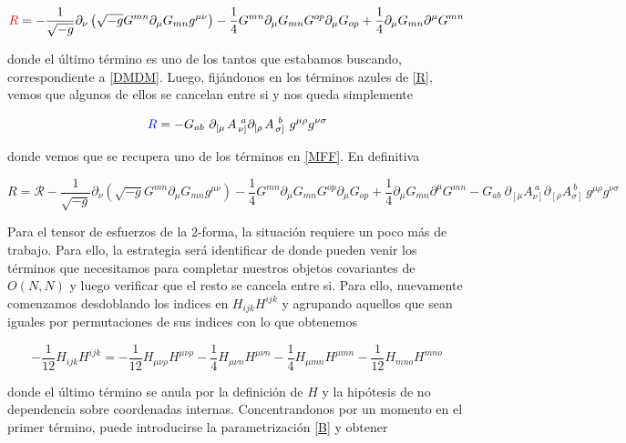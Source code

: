 \documentclass{article}
\numberwithin{equation}{section}
\begin{document}
\begin{equation}
\textcolor{red}{R} = - \frac{1}{\sqrt{-g}} \partial_{\nu} \left( \sqrt{-g} G^{m n} \partial_{\mu}{G_{m n}} g^{\mu \nu} \right) - \frac{1}{4} G^{m n} \partial_{\mu}{G_{m n}} G^{o p} \partial_{\mu}{G_{o p}} + \frac{1}{4} \partial_{\mu}{G_{m n}}\partial^{\mu} G^{m n}
\end{equation}

donde el último término es uno de los tantos que estabamos buscando, correspondiente a \ref{DMDM}.
Luego, fijándonos en los términos azules de \ref{R}, vemos que algunos de ellos se cancelan entre si y nos queda simplemente

\begin{equation}
\textcolor{blue}{R} = - G_{a b} \ \partial_{\left[\mu\right.} A_{\left.\nu\right]}^{\ a} \partial_{\left[\rho\right.} A_{\left.\sigma\right]}^{\ b} \ g^{\mu \rho} g^{\nu \sigma}
\end{equation}

donde vemos que se recupera uno de los términos en \ref{MFF}. En definitiva

\begin{equation}
R = \mathcal{R} - \frac{1}{\sqrt{-g}} \partial_{\nu} \left( \sqrt{-g} G^{m n} \partial_{\mu}{G_{m n}} g^{\mu \nu} \right) - \frac{1}{4} G^{m n} \partial_{\mu}{G_{m n}} G^{o p} \partial_{\mu}{G_{o p}} + \frac{1}{4} \partial_{\mu}{G_{m n}}\partial^{\mu} G^{m n} - G_{a b} \ \partial_{\left[\mu\right.} A_{\left.\nu\right]}^{\ a} \partial_{\left[\rho\right.} A_{\left.\sigma\right]}^{\ b} \ g^{\mu \rho} g^{\nu \sigma}
\end{equation}

Para el tensor de esfuerzos de la 2-forma, la situación requiere un poco más de trabajo. Para ello, la estrategia será identificar de donde pueden venir los términos que necesitamos para completar nuestros objetos covariantes de $ O(N,N) $ y luego verificar que el resto se cancela entre si. Para ello, nuevamente comenzamos desdoblando los indices en $ H_{i j k} H^{i j k} $ y agrupando aquellos que sean iguales por permutaciones de sus indices con lo que obtenemos

\begin{equation}\label{H1}
- \frac{1}{12} H_{i j k} H^{i j k} = - \frac{1}{12} H_{\mu \nu \rho} H^{\mu \nu \rho} - \frac{1}{4} H_{\mu \nu n} H^{\mu \nu n} - \frac{1}{4} H_{\mu m n} H^{\mu m n} - \frac{1}{12} H_{m n o} H^{m n o}
\end{equation}

donde el último término se anula por la definición de $ H $ y la hipótesis de no dependencia sobre coordenadas internas. Concentrandonos por un momento en el primer término, puede introducirse la parametrización \ref{B} y obtener
\end{document}
